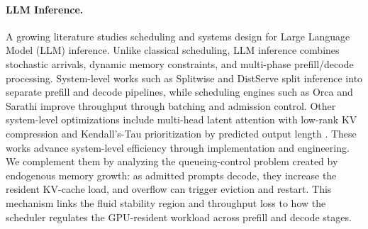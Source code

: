 \paragraph*{LLM Inference.} 
A growing literature studies scheduling and systems design for Large Language Model (LLM) inference. Unlike classical scheduling, LLM inference combines stochastic arrivals, dynamic memory constraints, and multi-phase prefill/decode processing. System-level works such as Splitwise \citep{patel2024splitwise} and DistServe \citep{zhong2024distserve} split inference into separate prefill and decode pipelines, while scheduling engines such as Orca \citep{yu2022orca} and Sarathi \citep{agrawal2023sarathi,agrawal2024taming} improve throughput through batching and admission control. Other system-level optimizations include multi-head latent attention with low-rank KV compression \citep{deepseekai2024deepseekv2strongeconomicalefficient} and Kendall's-Tau prioritization by predicted output length \citep{fu2025efficient}. These works advance system-level efficiency through implementation and engineering. We complement them by analyzing the queueing-control problem created by endogenous memory growth: as admitted prompts decode, they increase the resident KV-cache load, and overflow can trigger eviction and restart. This mechanism links the fluid stability region and throughput loss to how the scheduler regulates the GPU-resident workload across prefill and decode stages.

